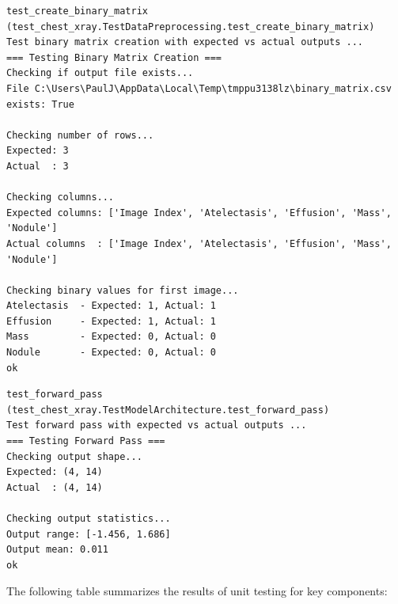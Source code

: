 \documentclass[12pt, titlepage]{article}
\begin{document}
\begin{verbatim}
test_create_binary_matrix (test_chest_xray.TestDataPreprocessing.test_create_binary_matrix)
Test binary matrix creation with expected vs actual outputs ...
=== Testing Binary Matrix Creation ===
Checking if output file exists...
File C:\Users\PaulJ\AppData\Local\Temp\tmppu3138lz\binary_matrix.csv exists: True

Checking number of rows...
Expected: 3
Actual  : 3

Checking columns...
Expected columns: ['Image Index', 'Atelectasis', 'Effusion', 'Mass', 'Nodule']
Actual columns  : ['Image Index', 'Atelectasis', 'Effusion', 'Mass', 'Nodule']

Checking binary values for first image...
Atelectasis  - Expected: 1, Actual: 1
Effusion     - Expected: 1, Actual: 1
Mass         - Expected: 0, Actual: 0
Nodule       - Expected: 0, Actual: 0
ok
\end{verbatim}

\begin{verbatim}
test_forward_pass (test_chest_xray.TestModelArchitecture.test_forward_pass)
Test forward pass with expected vs actual outputs ...
=== Testing Forward Pass ===
Checking output shape...
Expected: (4, 14)
Actual  : (4, 14)

Checking output statistics...
Output range: [-1.456, 1.686]
Output mean: 0.011
ok
\end{verbatim}

\pagebreak
The following table summarizes the results of unit testing for key components:
\end{document}
